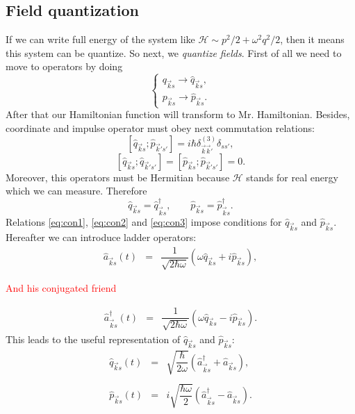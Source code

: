	\subsection{Field quantization}
	
	If we can write full energy of the system like $\mathscr{H} \sim p^2/2 + \omega^2 q^2/2$, then it means this system can be quantize.  So next, we  \textit{quantize fields}. First of all we need to move to operators by doing
	\begin{equation}
		\begin{cases}
		q_{\vec{k}s} \to \hat{q}_{\vec{k}s}, \\
		p_{\vec{k}s} \to \hat{p}_{\vec{k}s}.
		\end{cases}
	\end{equation}
	After that our Hamiltonian function will transform to Mr. Hamiltonian.
	Besides, coordinate and impulse operator must obey next commutation relations:
	\begin{equation}
		\left[\hat{q}_{\vec{k}s} ; \hat{p}_{\vec{k}'s'} \right] = i \hbar \delta^{(3)}_{\vec{k}\vec{k}'} \delta_{ss'},
		\label{eq:con1}
	\end{equation}
	\begin{equation}
		\left[\hat{q}_{\vec{k}s} ; \hat{q}_{\vec{k}'s'} \right] = \left[\hat{p}_{\vec{k}s} ; \hat{p}_{\vec{k}'s'} \right] = 0.
		\label{eq:con2}
	\end{equation}
	Moreover, this operators must be Hermitian because $\mathscr{H}$ stands for real energy which we can measure. Therefore
	\begin{equation}
		\hat{q}_{\vec{k}s} = \hat{q}^{\dagger}_{\vec{k}s}, \qquad \hat{p}_{\vec{k}s} = \hat{p}^{\dagger}_{\vec{k}s}.
		\label{eq:con3}
	\end{equation}
	Relations \eqref{eq:con1}, \eqref{eq:con2} and \eqref{eq:con3} impose conditions for $\hat{q}_{\vec{k}s}$ and $\hat{p}_{\vec{k}s}$.
	Hereafter we can introduce ladder operators:
	\begin{eqnarray}
		\hat{a}_{\vec{k}s}(t) &=& \dfrac{1}{\sqrt{2 \hbar \omega}} \left( \omega \hat{q}_{\vec{k}s} + i \hat{p}_{\vec{k}s} \right), %
\end{eqnarray}

  {\textcolor{red}{ And his conjugated friend }} 
  
  \begin{eqnarray}
		\hat{a}^{\dagger}_{\vec{k}s}(t) &=& \dfrac{1}{\sqrt{2 \hbar \omega}} \left( \omega \hat{q}_{\vec{k}s} - i \hat{p}_{\vec{k}s} \right).
	\end{eqnarray}
	This leads to the useful representation of $\hat{q}_{\vec{k}s}$ and $\hat{p}_{\vec{k}s}$:
	\begin{eqnarray}
		\hat{q}_{\vec{k}s}(t) &=& \sqrt{\dfrac{\hbar}{2 \omega}} \left( \hat{a}^{\dagger}_{\vec{k}s} +  \hat{a}_{\vec{k}s} \right), \\ \nonumber \\
		\hat{p}_{\vec{k}s}(t) &=& i \sqrt{\dfrac{\hbar \omega}{2}} \left( \hat{a}^{\dagger}_{\vec{k}s} -  \hat{a}_{\vec{k}s} \right).
	\end{eqnarray}
	
